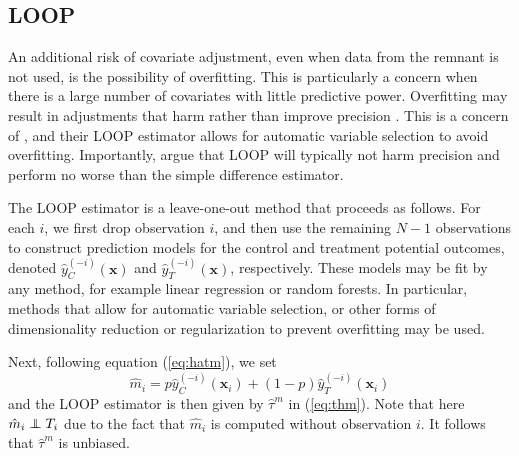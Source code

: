\subsection{LOOP} 

An additional risk of covariate adjustment, even when data from the remnant is not used, is the possibility of overfitting.  This is particularly a concern when there is a large number of covariates with little predictive power.  Overfitting may result in adjustments that harm rather than improve precision \citep{freedman2008regression, miratrix}.  This is a concern of \cite{loop}, and their LOOP estimator allows for automatic variable selection to avoid overfitting.  Importantly, \cite{loop} argue that LOOP will typically not harm precision and perform no worse than the simple difference estimator.

The LOOP estimator is a leave-one-out method that proceeds as follows.  For each $i$, we first drop observation $i$, and then use the remaining $N-1$ observations to construct prediction models for the control and treatment potential outcomes, denoted $\hat{y}^{(-i)}_C(\mathbf{x})$ and $\hat{y}^{(-i)}_T(\mathbf{x})$, respectively.  These models may be fit by any method, for example linear regression or random forests.  In particular, methods that allow for automatic variable selection, or other forms of dimensionality reduction or regularization to prevent overfitting may be used.  

Next, following equation (\ref{eq:hatm}), we set 
\begin{equation}
\hat{m}_i = p\hat{y}^{(-i)}_{C}(\mathbf{x}_i) + (1-p)\hat{y}^{(-i)}_{T}(\mathbf{x}_i)
\end{equation}
and the LOOP estimator is then given by $\hat{\tau}^m$ in (\ref{eq:thm}).  Note that here $\hat{m}_i \independent T_i$ due to the fact that $\hat{m}_i$ is computed without observation $i$.  It follows that $\hat{\tau}^m$ is unbiased.

